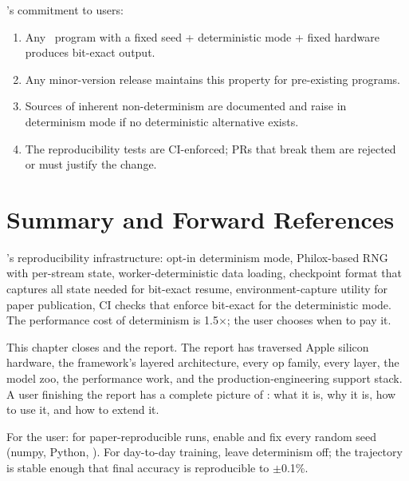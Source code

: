 \Lucid's commitment to users:

\begin{enumerate}
  \item Any \Lucid\ program with a fixed seed + deterministic
    mode + fixed hardware produces bit-exact output.
  \item Any minor-version release maintains this property for
    pre-existing programs.
  \item Sources of inherent non-determinism are documented and
    raise in determinism mode if no deterministic alternative
    exists.
  \item The reproducibility tests are CI-enforced; PRs that
    break them are rejected or must justify the change.
\end{enumerate}

\section{Summary and Forward References}
\label{sec:reproducibility:summary}

\Lucid's reproducibility infrastructure: opt-in determinism
mode, Philox-based RNG with per-stream state, worker-deterministic
data loading, checkpoint format that captures all state needed
for bit-exact resume, environment-capture utility for paper
publication, CI checks that enforce bit-exact for the
deterministic mode. The performance cost of determinism is
1.5$\times$; the user chooses when to pay it.

This chapter closes  and the report.
The report has traversed Apple silicon hardware, the framework's
layered architecture, every op family, every layer, the model
zoo, the performance work, and the production-engineering
support stack. A user finishing the report has a complete
picture of \Lucid: what it is, why it is, how to use it, and
how to extend it.

\begin{lucidnote}
For the user: for paper-reproducible runs, enable
 and
fix every random seed (numpy, Python, \Lucid). For day-to-day
training, leave determinism off; the trajectory is stable
enough that final accuracy is reproducible to $\pm$0.1\%.
\end{lucidnote}
